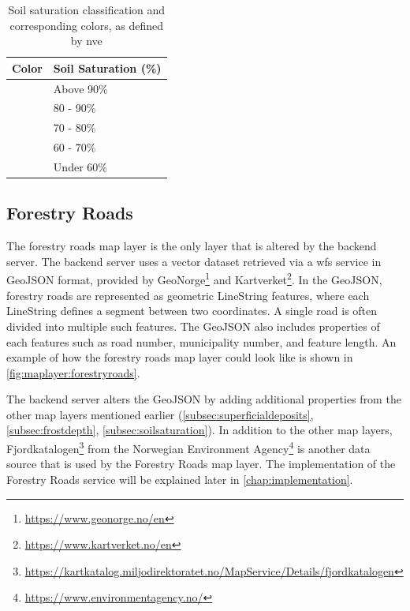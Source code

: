 \begin{table}[h]
    \centering
    \begin{tabular}{|l|l|}
        \hline  
        \textbf{Color} & \textbf{Soil Saturation (\%)} \\
        \hline
        \cellcolor[HTML]{f82200} & Above 90\% \\
        \hline
        \cellcolor[HTML]{f8c400} & 80 - 90\% \\
        \hline
        \cellcolor[HTML]{f8fc00} & 70 - 80\% \\
        \hline
        \cellcolor[HTML]{29d460} & 60 - 70\% \\
        \hline
        \cellcolor[HTML]{e4e4e4} & Under 60\% \\
        \hline
    \end{tabular}
    \caption[Soil saturation classification and corresponding colors]{Soil saturation classification and corresponding colors, as defined by \acrshort{nve} \cite{nve2025waterdata}}
    \label{tab:soil_saturation_classification}
\end{table}

\subsection{Forestry Roads}

The forestry roads map layer is the only layer that is altered by the backend server. The backend server uses a vector dataset retrieved via a \Gls{wfs} service in GeoJSON format, provided by GeoNorge\footnote{\url{https://www.geonorge.no/en}} and Kartverket\footnote{\url{https://www.kartverket.no/en}}. In the GeoJSON, forestry roads are represented as geometric LineString features, where each LineString defines a segment between two coordinates. A single road is often divided into multiple such features. The GeoJSON also includes properties of each features such as road number, municipality number, and feature length. An example of how the forestry roads map layer could look like is shown in \autoref{fig:maplayer:forestryroads}.

The backend server alters the GeoJSON by adding additional properties from the other map layers mentioned earlier (\ref{subsec:superficialdeposits}, \ref{subsec:frostdepth}, \ref{subsec:soilsaturation}). In addition to the other map layers, Fjordkatalogen\footnote{\url{https://kartkatalog.miljodirektoratet.no/MapService/Details/fjordkatalogen}} from the Norwegian Environment Agency\footnote{\url{https://www.environmentagency.no/}} is another data source that is used by the Forestry Roads map layer. The implementation of the Forestry Roads service will be explained later in \autoref{chap:implementation}. 

